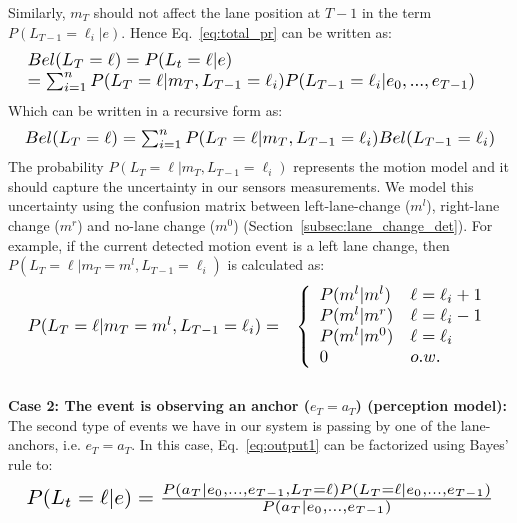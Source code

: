 \documentclass[10pt, conference, compsocconf]{IEEEtran}
\begin{document}
Similarly, $m_T$ should not affect the lane position at $T-1$ in the term $P(L_{T-1}=\ell_i|e)$. Hence Eq.~\ref{eq:total_pr} can be written as:
\begin{equation}
\resizebox{\columnwidth}{!}{$\displaystyle \begin{array}{ll}
Bel(L_T=\ell)= P(L_t=\ell|e) & \\
= \sum_{i=1}^{n} P(L_T=\ell|m_T,L_{T-1}=\ell_i)P(L_{T-1}=\ell_i|e_0,...,e_{T-1})&
 \end{array}
 $}
\end{equation}
Which can be written in a recursive form as:
\begin{equation}
\resizebox{\columnwidth}{!}{
$Bel(L_T=\ell) = \sum_{i=1}^{n} P(L_T=\ell|m_T, L_{T-1}=\ell_i)Bel(L_{T-1}=\ell_i)$
}
\end{equation}
The probability $P(L_T=\ell|m_T, L_{T-1}=\ell_i)$ represents the motion model and it should capture the uncertainty in our sensors measurements. We model this uncertainty using the
confusion matrix between left-lane-change ($m^l$), right-lane change ($m^r$) and no-lane change ($m^0$) (Section~\ref{subsec:lane_change_det}). For example, if the current detected motion event is a left lane change, then $P(L_T=\ell|m_T=m^l,L_{T-1}=\ell_i)$ is calculated as:
\vspace*{-13pt}
\begin{equation}\resizebox{\columnwidth}{!}{$\displaystyle \begin{array}{cr}
P(L_T=\ell|m_T=m^l,L_{T-1}=\ell_i) = &
\left\{
\begin{array}{ll}
      P(m^l|m^l) & \ell = \ell_{i}+1\\
      P(m^l|m^r) & \ell = \ell_{i}-1\\
      P(m^l|m^0) & \ell = \ell_{i}\\
       0 & o.w.\\
\end{array}
\right.
\end{array}
$}\label{eq:motion_r}
\end{equation}
\vspace*{5pt}
\\
\textbf{Case 2: The event is observing an anchor ($e_T=a_T$) (perception model):}
\\
The second type of events we have in our system is passing by one of the lane-anchors, i.e. $e_T=a_T$.
In this case, Eq.~\ref{eq:output1} can be factorized using Bayes' rule to:
\begin{equation}
\resizebox{\columnwidth}{!}{
$P(L_t=\ell|e) = \frac{P(a_T|e_0,...,e_{T-1},L_T=\ell)P(L_T=\ell|e_0,...,e_{T-1})}{P(a_T|e_0,...,e_{T-1})}$
}
\end{equation}
\end{document}
